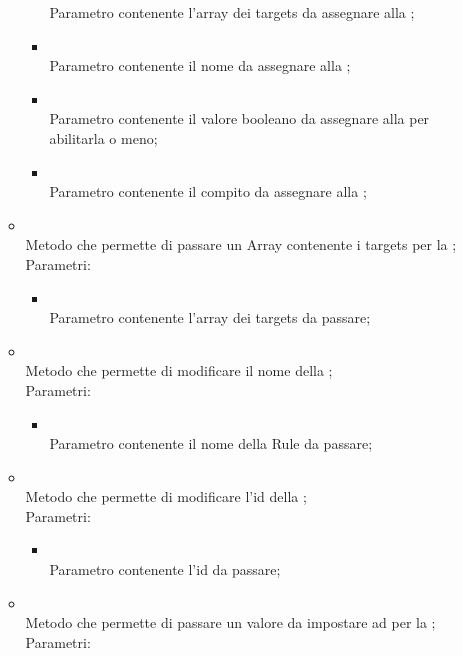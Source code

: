 \begin{itemize}
\begin{itemize}
\begin{itemize}
			Parametro contenente l'array dei targets da assegnare alla ;
			\item {} \\
			Parametro contenente il nome da assegnare alla ;
			\item {} \\
			Parametro contenente il valore booleano da assegnare alla  per abilitarla o meno;
			\item {} \\
			Parametro contenente il compito da assegnare alla ;
		\end{itemize}
		\item[]  \\		Metodo che permette di passare un Array contenente i targets per la ;\\
		Parametri:
		\begin{itemize}
			\item {} \\
			Parametro contenente l'array dei targets da passare;
		\end{itemize}
		\item[]  \\		Metodo che permette di modificare il nome della ;\\
		Parametri:
		\begin{itemize}
			\item {} \\
			Parametro contenente il nome della Rule da passare;
		\end{itemize}
		\item[]  \\		Metodo che permette di modificare l'id della ;\\
		Parametri:
		\begin{itemize}
			\item {} \\
			Parametro contenente l'id da passare;
		\end{itemize}
		\item[]  \\		Metodo che permette di passare un valore da impostare ad  per la ;\\
		Parametri:
		\begin{itemize}

\end{itemize}
\end{itemize}
\end{itemize}
